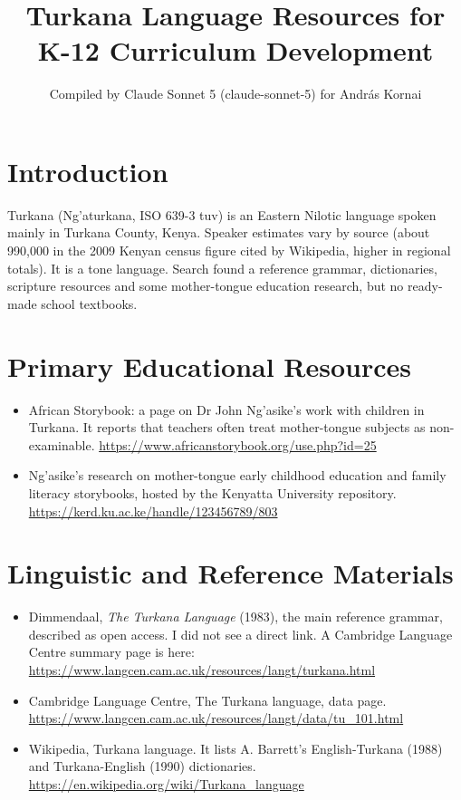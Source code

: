 \documentclass[12pt]{article}
\title{Turkana Language Resources for K-12 Curriculum Development}
\author{Compiled by Claude Sonnet 5 (claude-sonnet-5) for Andr\'as Kornai}
\date{}
\begin{document}
\maketitle

\section{Introduction}
Turkana (Ng'aturkana, ISO 639-3 tuv) is an Eastern Nilotic language spoken mainly in Turkana County, Kenya. Speaker estimates vary by source (about 990,000 in the 2009 Kenyan census figure cited by Wikipedia, higher in regional totals). It is a tone language. Search found a reference grammar, dictionaries, scripture resources and some mother-tongue education research, but no ready-made school textbooks.

\section{Primary Educational Resources}
\begin{itemize}
\item African Storybook: a page on Dr John Ng'asike's work with children in Turkana. It reports that teachers often treat mother-tongue subjects as non-examinable. \url{https://www.africanstorybook.org/use.php?id=25}
\item Ng'asike's research on mother-tongue early childhood education and family literacy storybooks, hosted by the Kenyatta University repository. \url{https://kerd.ku.ac.ke/handle/123456789/803}
\end{itemize}

\section{Linguistic and Reference Materials}
\begin{itemize}
\item Dimmendaal, \emph{The Turkana Language} (1983), the main reference grammar, described as open access. I did not see a direct link. A Cambridge Language Centre summary page is here: \url{https://www.langcen.cam.ac.uk/resources/langt/turkana.html}
\item Cambridge Language Centre, The Turkana language, data page. \url{https://www.langcen.cam.ac.uk/resources/langt/data/tu_101.html}
\item Wikipedia, Turkana language. It lists A. Barrett's English-Turkana (1988) and Turkana-English (1990) dictionaries. \url{https://en.wikipedia.org/wiki/Turkana_language}
\end{itemize}
\end{document}
